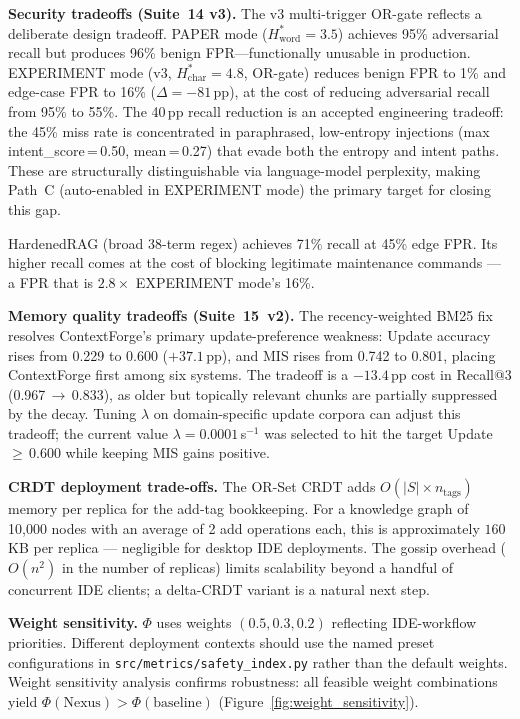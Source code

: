 \documentclass[11pt,twocolumn]{article}
\begin{document}
\textbf{Security tradeoffs (Suite~14 v3).}
The v3 multi-trigger OR-gate reflects a deliberate design tradeoff.
PAPER mode ($H^{*}_{\mathrm{word}}=3.5$) achieves 95\% adversarial recall
but produces 96\% benign FPR---functionally unusable in production.
EXPERIMENT mode (v3, $H^{*}_{\mathrm{char}}=4.8$, OR-gate) reduces benign
FPR to 1\% and edge-case FPR to 16\% ($\Delta=-81$\,pp), at the cost of
reducing adversarial recall from 95\% to 55\%.  The 40\,pp recall reduction
is an accepted engineering tradeoff: the 45\% miss rate is concentrated in
paraphrased, low-entropy injections (max intent\_score\,=\,0.50, mean\,=\,0.27)
that evade both the entropy and intent paths.  These are structurally distinguishable
via language-model perplexity, making Path~C (auto-enabled in EXPERIMENT mode)
the primary target for closing this gap.

HardenedRAG (broad 38-term regex) achieves 71\% recall at 45\% edge FPR.
Its higher recall comes at the cost of blocking legitimate maintenance commands
--- a FPR that is $2.8\times$ EXPERIMENT mode's 16\%.

\textbf{Memory quality tradeoffs (Suite~15~v2).}
The recency-weighted BM25 fix resolves ContextForge's primary update-preference
weakness: Update accuracy rises from 0.229 to 0.600 ($+37.1$\,pp), and MIS
rises from 0.742 to 0.801, placing ContextForge first among six systems.
The tradeoff is a $-13.4$\,pp cost in Recall@3 (0.967\,$\to$\,0.833), as older
but topically relevant chunks are partially suppressed by the decay. Tuning
$\lambda$ on domain-specific update corpora can adjust this tradeoff; the
current value $\lambda=0.0001$\,s$^{-1}$ was selected to hit the target
Update\,$\geq$\,0.600 while keeping MIS gains positive.

\textbf{CRDT deployment trade-offs.}
The OR-Set CRDT adds $O(|S| \times n_{\mathrm{tags}})$ memory per replica
for the add-tag bookkeeping. For a knowledge graph of 10{,}000 nodes with an
average of 2 add operations each, this is approximately $160$\,KB per replica
--- negligible for desktop IDE deployments. The gossip overhead ($O(n^2)$ in
the number of replicas) limits scalability beyond a handful of concurrent IDE
clients; a delta-CRDT variant is a natural next step.

\textbf{Weight sensitivity.}
$\Phi$ uses weights $(0.5, 0.3, 0.2)$ reflecting IDE-workflow priorities.
Different deployment contexts should use the named preset configurations in
\texttt{src/metrics/safety\_index.py} rather than the default weights. Weight
sensitivity analysis confirms robustness: all feasible weight combinations
yield $\Phi(\text{Nexus}) > \Phi(\text{baseline})$
(Figure~\ref{fig:weight_sensitivity}).
\end{document}
